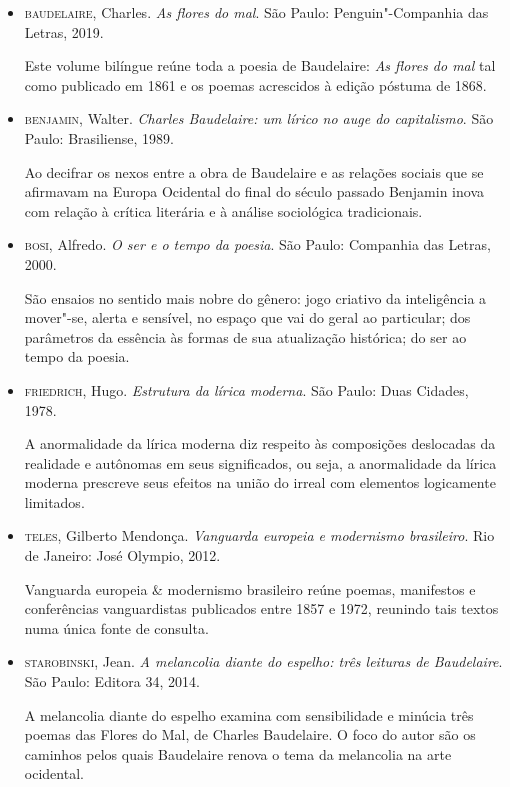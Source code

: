 \documentclass[12pt]{extarticle}
\begin{document}
\begin{itemize}
\item\textsc{baudelaire}, Charles. \textit{As flores do mal}. São Paulo:
Penguin"-Companhia das Letras, 2019.

Este volume bilíngue reúne toda a poesia de Baudelaire: \textit{As flores do mal}
tal como publicado em 1861 e os poemas acrescidos à edição póstuma de
1868.

\item\textsc{benjamin}, Walter. \textit{Charles Baudelaire: um lírico no auge do
capitalismo}. São Paulo: Brasiliense, 1989.

Ao decifrar os nexos entre a obra de Baudelaire e as relações sociais
que se afirmavam na Europa Ocidental do final do século passado Benjamin
inova com relação à crítica literária e à análise sociológica
tradicionais.

\item\textsc{bosi}, Alfredo. \textit{O ser e o tempo da poesia}. São Paulo: Companhia
das Letras, 2000.

São ensaios no sentido mais nobre do gênero: jogo criativo da
inteligência a mover"-se, alerta e sensível, no espaço que vai do geral
ao particular; dos parâmetros da essência às formas de sua atualização
histórica; do ser ao tempo da poesia.

\item\textsc{friedrich}, Hugo. \textit{Estrutura da lírica moderna}. São Paulo: Duas
Cidades, 1978.

A anormalidade da lírica moderna diz respeito às composições deslocadas
da realidade e autônomas em seus significados, ou seja, a anormalidade
da lírica moderna prescreve seus efeitos na união do irreal com
elementos logicamente limitados.

\item\textsc{teles}, Gilberto Mendonça. \textit{Vanguarda europeia e modernismo
brasileiro}. Rio de Janeiro: José Olympio, 2012.

Vanguarda europeia \& modernismo brasileiro reúne poemas, manifestos e
conferências vanguardistas publicados entre 1857 e 1972, reunindo tais
textos numa única fonte de consulta.

\item\textsc{starobinski}, Jean. \textit{A melancolia diante do espelho: três leituras de Baudelaire}. São Paulo: Editora 34, 2014.

A melancolia diante do espelho examina com sensibilidade e minúcia três
poemas das Flores do Mal, de Charles Baudelaire. O foco do autor são os
caminhos pelos quais Baudelaire renova o tema da melancolia na arte
ocidental.
\end{itemize}
\end{document}
